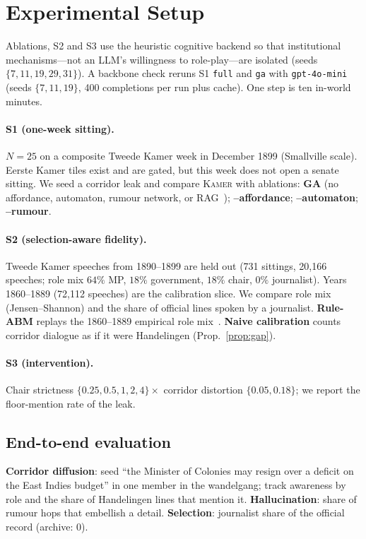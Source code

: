 \documentclass[sigconf,review,anonymous]{acmart}
\newcommand{\sys}{\textsc{Kamer}}
\begin{document}
\section{Experimental Setup}
\label{sec:experiments}

Ablations, S2 and S3 use the heuristic cognitive backend so that
institutional mechanisms---not an LLM's willingness to role-play---are
isolated (seeds $\{7,11,19,29,31\}$). A backbone check reruns S1
\texttt{full} and \texttt{ga} with \texttt{gpt-4o-mini} (seeds $\{7,11,19\}$,
400 completions per run plus cache). One step is ten in-world minutes.

\paragraph{S1 (one-week sitting).} $N{=}25$ on a composite Tweede Kamer
week in December 1899 (Smallville scale). Eerste Kamer tiles exist and are
gated, but this week does not open a senate sitting. We seed a corridor leak and
compare \sys{} with ablations: \textbf{GA} (no affordance, automaton,
rumour network, or RAG~\cite{park2023generative}); \textbf{--affordance};
\textbf{--automaton}; \textbf{--rumour}.

\paragraph{S2 (selection-aware fidelity).} Tweede Kamer speeches from
1890--1899 are held out (731 sittings, 20{,}166 speeches; role mix
$64\%$ MP, $18\%$ government, $18\%$ chair, $0\%$ journalist). Years
1860--1889 (72{,}112 speeches) are the calibration slice. We compare
role mix (Jensen--Shannon) and the share of official lines spoken by a
journalist. \textbf{Rule-ABM} replays the 1860--1889 empirical role
mix~\cite{epstein1996growing}. \textbf{Naive calibration} counts corridor
dialogue as if it were Handelingen (Prop.~\ref{prop:gap}).

\paragraph{S3 (intervention).} Chair strictness
$\{0.25,0.5,1,2,4\}\times$ corridor distortion $\{0.05,0.18\}$; we report
the floor-mention rate of the leak.

\subsection{End-to-end evaluation}
\label{sec:eval-e2e}
\textbf{Corridor diffusion}: seed ``the Minister of Colonies may resign
over a deficit on the East Indies budget'' in one member in the wandelgang;
track awareness by role and the share of Handelingen lines that mention it.
\textbf{Hallucination}: share of rumour hops that embellish a detail.
\textbf{Selection}: journalist share of the official record (archive:
$0$).
\end{document}

